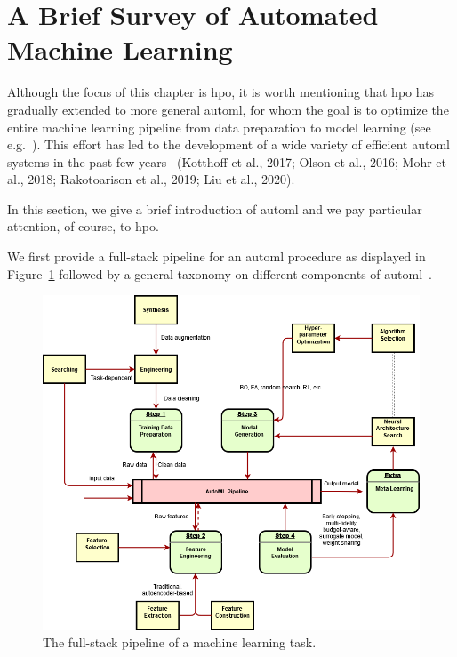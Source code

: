 \section{A Brief Survey of Automated Machine Learning}\label{sec:dttts.survey}

Although the focus of this chapter is \gls{hpo}, it is worth mentioning that \gls{hpo} has gradually extended to more general \gls{automl}, for whom the goal is to optimize the entire machine learning pipeline from data preparation to model learning (see e.g.~\citealt{feurer2015fms}). This effort has led to the development of a wide variety of efficient
\gls{automl} systems in the past few years~\citep{thornton2013autoweka} (Kotthoff et al., 2017; Olson et al., 2016; Mohr et al.,
2018; Rakotoarison et al., 2019; Liu et al., 2020).

In this section, we give a brief introduction of \gls{automl} and we pay particular attention, of course, to \gls{hpo}. 

We first provide a full-stack pipeline for an \gls{automl} procedure as displayed in Figure~\ref{fig:automl} followed by a general taxonomy on different components of \gls{automl}~\citep{hutter2019automl,zoller2019automl,he2019automl}. 

\begin{figure}[ht]
    \centering
    \includegraphics[width=\textwidth]{Chapter6/img/automl.png}
    \caption{The full-stack pipeline of a machine learning task.}
    \label{fig:automl}
\end{figure}


